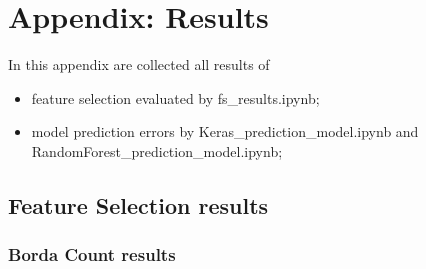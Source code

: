 \chapter{Appendix: Results}
In this appendix are collected all results of
\begin{itemize}
    \item feature selection evaluated by fs\_results.ipynb;
    \item model prediction errors by Keras\_prediction\_model.ipynb and RandomForest\_prediction\_model.ipynb;
\end{itemize}
\pagebreak
\clearpage
\section{Feature Selection results}
\subsection{Borda Count results}
